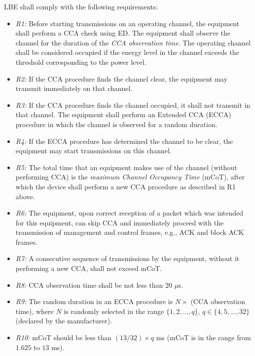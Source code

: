 \documentclass[12pt,onecolumn]{article}
\begin{document}
LBE shall comply with the following requirements:

\begin{itemize}

\item
\textit{R1:} Before starting transmissions on an operating channel, the equipment shall perform a CCA check using ED. The equipment shall observe the channel for the duration of the \textit{CCA observation time}. The operating channel shall be considered occupied if the energy level in the channel exceeds the threshold corresponding to the power level.

\item
\textit{R2:}
If the CCA procedure finds the channel clear, the equipment may transmit immediately on that channel.

\item
\textit{R3:}
If the CCA procedure finds the channel occupied, it shall not transmit in that channel. The equipment shall perform an Extended CCA (ECCA) procedure in which the channel is observed for a random duration.

\item
\textit{R4:}
If the ECCA procedure has determined the channel to be clear, the equipment may start transmissions on this channel.

\item
\textit{R5:}
The total time that an equipment makes use of the channel (without performing CCA) is the \textit{maximum Channel Occupancy Time} (mCoT), after which the device shall perform a new CCA procedure as described in R1 above.

\item
\textit{R6:}
The equipment, upon correct reception of a packet which was intended for this equipment, can skip CCA and immediately proceed with the transmission of management and control frames, e.g., ACK and block ACK frames.

\item
\textit{R7:}
A consecutive sequence of transmissions by the equipment, without it performing a new CCA, shall not exceed mCoT.

\item
\textit{R8:}
CCA observation time shall be not less than $20$ $\mu$s.

\item
\textit{R9:}
The random duration in an ECCA procedure is $N \times$ (CCA observation time), where $N$ is randomly selected in the range $\{1,2,...,q\}$, $q \in \{4,5,...,32\}$ (declared by the manufacturer).

\item
\textit{R10:}
mCoT should be less than $(13/32)\times q$ ms (mCoT is in the range from $1.625$ to $13$ ms).

\end{itemize}
\end{document}
